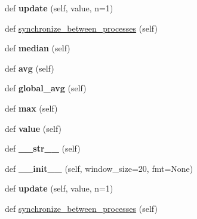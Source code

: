 \begin{DoxyCompactItemize}
\item 
\mbox{\label{classutils_1_1SmoothedValue_ad907a5758d104cef55dbc7056f29d6e4}} 
def {\bfseries update} (self, value, n=1)
\item 
def \hyperlink{classutils_1_1SmoothedValue_a8d10c867abf46adb6b0be5b6adcf1236}{synchronize\+\_\+between\+\_\+processes} (self)
\item 
\mbox{\label{classutils_1_1SmoothedValue_ab3e14bcdb1429898324595abbf30ec07}} 
def {\bfseries median} (self)
\item 
\mbox{\label{classutils_1_1SmoothedValue_a17cc6f86030d87fe010925409bc1ed2a}} 
def {\bfseries avg} (self)
\item 
\mbox{\label{classutils_1_1SmoothedValue_a36a8e70157cd8708141835f19b5d972d}} 
def {\bfseries global\+\_\+avg} (self)
\item 
\mbox{\label{classutils_1_1SmoothedValue_a158b58316c2fce950e45973acd514523}} 
def {\bfseries max} (self)
\item 
\mbox{\label{classutils_1_1SmoothedValue_a102baf7191d54900fc448004a41f4da5}} 
def {\bfseries value} (self)
\item 
\mbox{\label{classutils_1_1SmoothedValue_ad4cc419248d1d78c567600ecf8236e6a}} 
def {\bfseries \+\_\+\+\_\+str\+\_\+\+\_\+} (self)
\item 
\mbox{\label{classutils_1_1SmoothedValue_ae3f395e1967e26ff15efbdd5149dc1ee}} 
def {\bfseries \+\_\+\+\_\+init\+\_\+\+\_\+} (self, window\+\_\+size=20, fmt=None)
\item 
\mbox{\label{classutils_1_1SmoothedValue_ad907a5758d104cef55dbc7056f29d6e4}} 
def {\bfseries update} (self, value, n=1)
\item 
def \hyperlink{classutils_1_1SmoothedValue_a8d10c867abf46adb6b0be5b6adcf1236}{synchronize\+\_\+between\+\_\+processes} (self)
\item 
\mbox{\label{classutils_1_1SmoothedValue_ab3e14bcdb1429898324595abbf30ec07}} 

\end{DoxyCompactItemize}
